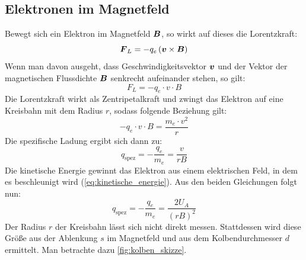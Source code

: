 \documentclass[ngerman]{scrartcl}
\begin{document}
\subsection[Elektronen im Magnetfeld]{Elektronen im Magnetfeld \cite{ref:angabe_elektronen}}
\label{subsec:grundlagen_elektronen_im_magnetfeld}
%
Bewegt sich ein Elektron im Magnetfeld $\vb*{B}$, so wirkt auf dieses die Lorentzkraft:
%
\begin{equation}
    \label{eq:lorentzkraft}
    \vb*{F}_L = - q_e \left(\vb*{v} \times \vb*{B} \right)
\end{equation}
%
Wenn man davon ausgeht, dass Geschwindigkeitsvektor $\vb*{v}$ und der Vektor der magnetischen Flussdichte $\vb*{B}$ senkrecht aufeinander stehen, so gilt:
\begin{equation}
    \label{eq:lorentzkraft_orthogonal}
    F_L = -q_e \cdot v \cdot B
\end{equation}
%
Die Lorentzkraft wirkt als Zentripetalkraft und zwingt das Elektron auf eine Kreisbahn mit dem Radius $r$, sodass folgende Beziehung gilt:
\[-q_e \cdot v \cdot B = \frac{m_e \cdot v^2}{r}\]
Die spezifische Ladung ergibt sich dann zu:
\begin{equation}
    \label{eq:spezifische_ladung}
    q_{\text{spez}} = - \frac{q_e}{m_e} = \frac{v}{rB}
\end{equation}
Die kinetische Energie gewinnt das Elektron aus einem elektrischen Feld, in dem es beschleunigt wird (\autoref{eq:kinetische_energie}). Aus den beiden Gleichungen folgt nun:
\[q_{\text{spez}} = - \frac{q_e}{m_e} = \frac{2 U_A}{(rB)^2}\]
Der Radius $r$ der Kreisbahn lässt sich nicht direkt messen. Stattdessen wird diese Größe aus der Ablenkung $s$ im Magnetfeld und aus dem Kolbendurchmesser $d$ ermittelt. Man betrachte dazu \autoref{fig:kolben_skizze}.
\end{document}
